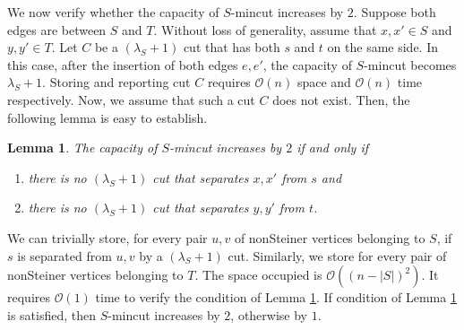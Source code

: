 \documentclass[letterpaper,11pt]{article}
\newtheorem{lemma}{Lemma}[]
\begin{document}
We now verify whether the capacity of $S$-mincut increases by $2$. Suppose both edges are between $S$ and $T$. Without loss of generality, assume that $x,x'\in S$ and $y,y'\in T$. Let $C$ be a $(\lambda_S+1)$ cut that has both $s$ and $t$ on the same side. In this case, after the insertion of both edges $e,e'$, the capacity of $S$-mincut becomes $\lambda_S+1$. Storing and reporting cut $C$ requires ${\mathcal O}(n)$ space and ${\mathcal O}(n)$ time respectively. Now, we assume that such a cut $C$ does not exist. Then, the following lemma is easy to establish. \begin{lemma} \label{lem : increase by 2 condition}
    The capacity of $S$-mincut increases by $2$ if and only if 
    \begin{enumerate}
        \item there is no $(\lambda_S+1)$ cut that separates $x,x'$ from $s$ and 
        \item there is no $(\lambda_S+1)$ cut that separates $y,y'$ from $t$.
    \end{enumerate}
\end{lemma}
We can trivially store, for every pair $u,v$ of nonSteiner vertices belonging to $S$, if $s$ is separated from $u,v$ by a $(\lambda_S+1)$ cut. Similarly, we store for every pair of nonSteiner vertices belonging to $T$. The space occupied is ${\mathcal O}((n-|S|)^2)$. It requires ${\mathcal O}(1)$ time to verify the condition of Lemma \ref{lem : increase by 2 condition}. If condition of Lemma \ref{lem : increase by 2 condition} is satisfied, then $S$-mincut increases by $2$, otherwise by $1$.\\
\end{document}

